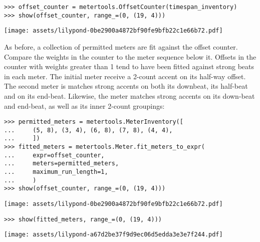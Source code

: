 \begin{abjadbookoutput}
\begin{singlespacing}
\vspace{-0.5\baselineskip}
\begin{verbatim}
>>> offset_counter = metertools.OffsetCounter(timespan_inventory)
>>> show(offset_counter, range_=(0, (19, 4)))
\end{verbatim}
\noindent\texttt{[image: assets/lilypond-0be2900a4872bf90fe9bfb22c1e66b72.pdf]}
\end{singlespacing}
\end{abjadbookoutput}

\noindent As before, a collection of permitted meters are fit against the
offset counter. Compare the weights in the counter to the meter sequence below
it. Offsets in the counter with weights greater than 1 tend to have been fitted
against strong beats in each meter. The initial  meter receive a
2-count accent on its half-way  offset. The second 
meter is matches strong accents on both its downbeat, its half-beat and on its
end-beat. Likewise, the  meter matches strong accents on its
down-beat and end-beat, as well as its inner 2-count groupings:

\begin{comment}
<abjad>
permitted_meters = metertools.MeterInventory([
    (5, 8), (3, 4), (6, 8), (7, 8), (4, 4),
    ])
fitted_meters = metertools.Meter.fit_meters_to_expr(
    expr=offset_counter,
    meters=permitted_meters,
    maximum_run_length=1,
    )
show(offset_counter, range_=(0, (19, 4)))
show(fitted_meters, range_=(0, (19, 4)))
</abjad>
\end{comment}

\begin{abjadbookoutput}
\begin{singlespacing}
\vspace{-0.5\baselineskip}
\begin{verbatim}
>>> permitted_meters = metertools.MeterInventory([
...     (5, 8), (3, 4), (6, 8), (7, 8), (4, 4),
...     ])
>>> fitted_meters = metertools.Meter.fit_meters_to_expr(
...     expr=offset_counter,
...     meters=permitted_meters,
...     maximum_run_length=1,
...     )
>>> show(offset_counter, range_=(0, (19, 4)))
\end{verbatim}
\noindent\texttt{[image: assets/lilypond-0be2900a4872bf90fe9bfb22c1e66b72.pdf]}
\begin{verbatim}
>>> show(fitted_meters, range_=(0, (19, 4)))
\end{verbatim}
\noindent\texttt{[image: assets/lilypond-a67d2be37f9d9ec06d5edda3e3e7f244.pdf]}
\end{singlespacing}
\end{abjadbookoutput}

